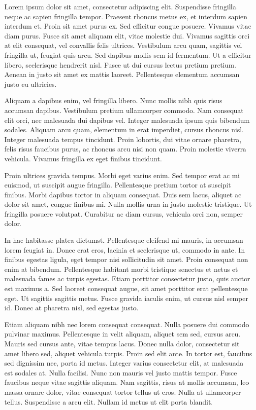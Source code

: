 \par
Lorem ipsum dolor sit amet, consectetur adipiscing elit. Suspendisse fringilla
neque ac sapien fringilla tempor. Praesent rhoncus metus ex, et interdum sapien
interdum et. Proin sit amet purus ex. Sed efficitur congue posuere. Vivamus
vitae diam purus. Fusce sit amet aliquam elit, vitae molestie dui. Vivamus
sagittis orci at elit consequat, vel convallis felis ultrices. Vestibulum arcu
quam, sagittis vel fringilla ut, feugiat quis arcu. Sed dapibus mollis sem id
fermentum. Ut a efficitur libero, scelerisque hendrerit nisl. Fusce ut dui
cursus lectus pretium pretium. Aenean in justo sit amet ex mattis laoreet.
Pellentesque elementum accumsan justo eu ultricies.

Aliquam a dapibus enim, vel fringilla libero. Nunc mollis nibh quis risus
accumsan dapibus. Vestibulum pretium ullamcorper commodo. Nam consequat elit
orci, nec malesuada dui dapibus vel. Integer malesuada ipsum quis bibendum
sodales. Aliquam arcu quam, elementum in erat imperdiet, cursus rhoncus nisl.
Integer malesuada tempus tincidunt. Proin lobortis, dui vitae ornare pharetra,
felis risus faucibus purus, ac rhoncus arcu nisi non quam. Proin molestie
viverra vehicula. Vivamus fringilla ex eget finibus tincidunt.

Proin ultrices gravida tempus. Morbi eget varius enim. Sed tempor erat ac mi
euismod, ut suscipit augue fringilla. Pellentesque pretium tortor at suscipit
finibus. Morbi dapibus tortor in aliquam consequat. Duis sem lacus, aliquet ac
dolor sit amet, congue finibus mi. Nulla mollis urna in justo molestie
tristique. Ut fringilla posuere volutpat. Curabitur ac diam cursus, vehicula
orci non, semper dolor.

In hac habitasse platea dictumst. Pellentesque eleifend mi mauris, in accumsan
lorem feugiat in. Donec erat eros, lacinia et scelerisque ut, commodo in ante.
In finibus egestas ligula, eget tempor nisi sollicitudin sit amet. Proin
consequat non enim at bibendum. Pellentesque habitant morbi tristique senectus
et netus et malesuada fames ac turpis egestas. Etiam porttitor consectetur
justo, quis auctor est maximus a. Sed laoreet consequat augue, sit amet
porttitor erat pellentesque eget. Ut sagittis sagittis metus. Fusce gravida
iaculis enim, ut cursus nisl semper id. Donec at pharetra nisl, sed egestas
justo.

Etiam aliquam nibh nec lorem consequat consequat. Nulla posuere dui commodo
pulvinar maximus. Pellentesque in velit aliquam, aliquet sem sed, cursus arcu.
Mauris sed cursus ante, vitae tempus lacus. Donec nulla dolor, consectetur sit
amet libero sed, aliquet vehicula turpis. Proin sed elit ante. In tortor est,
faucibus sed dignissim nec, porta id metus. Integer varius consectetur elit, at
malesuada est sodales at. Nulla facilisi. Nunc non mauris vel justo mattis
tempor. Fusce faucibus neque vitae sagittis aliquam. Nam sagittis, risus at
mollis accumsan, leo massa ornare dolor, vitae consequat tortor tellus ut eros.
Nulla at ullamcorper tellus. Suspendisse a arcu elit. Nullam id metus ut elit
porta blandit.

